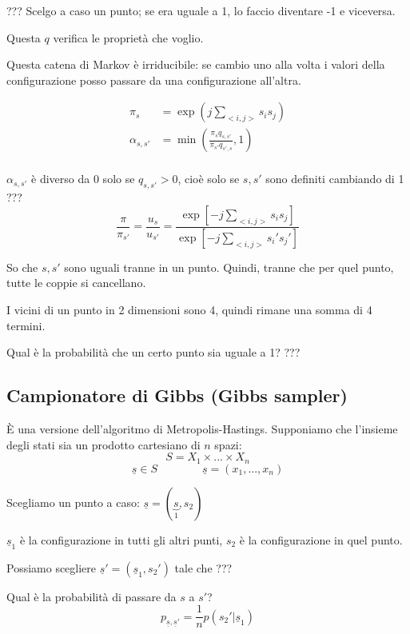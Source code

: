 \documentclass[a4paper,12pt]{book}
\begin{document}
??? %
 Scelgo a caso un punto; se era uguale a 1, lo faccio diventare -1 e viceversa. 

Questa $ q $ verifica le proprietà che voglio. %

Questa catena di Markov è irriducibile: se cambio uno alla volta i valori della configurazione posso passare da una configurazione all'altra.

\begin{align*}
	\pi_s & = \exp (j \sum_{<i,j>} s_i s_j) \\
	\alpha_{s,s'} & = \min \left( \frac{\pi_s q_{s,s'}}{\pi_{s'} q_{s',s}} , 1 \right) \\
\end{align*}

$\alpha_{s,s'}$ è diverso da 0 solo se $ q_{s,s'} > 0 $, cioè solo se $ s,s' $ sono definiti cambiando di 1 ??? %
$$ \frac{\pi}{\pi_{s'}} = \frac{u_s}{u_{s'}} = \frac{\exp \left[ -j \sum_{<i,j>} s_i s_j
	 \right]}{ \exp \left[ -j \sum_{<i,j>} s_i' s_j' \right] } $$

So che $ s,s' $ sono uguali tranne in un punto. Quindi, tranne che per quel punto, tutte le coppie si cancellano. 

I vicini di un punto in 2 dimensioni sono 4, quindi rimane una somma di 4 termini.

Qual è la probabilità che un certo punto sia uguale a 1? ??? %


\subsection{Campionatore di Gibbs (Gibbs sampler)}
È una versione dell'algoritmo di Metropolis-Hastings. Supponiamo che l'insieme degli stati sia un prodotto cartesiano di $ n $ spazi: 
$$ S = X_1 \times ... \times X_n $$
$$ \underline{s} \in S \qquad \qquad \underline{s} = (x_1, ..., x_n) $$

Scegliamo un punto a caso: $ \underline{s} = (\underbrace{s}_1, s_2) $

$ \underline{s}_1 $ è la configurazione in tutti gli altri punti, $ s_2 $ è la configurazione in quel punto. %

Possiamo scegliere $ \underline{s}' = (\underline{s}_1, s_2') $ tale che ??? %

Qual è la probabilità di passare da $ s $ a $ s' $?
$$ p_{\underline{s}, \underline{s}'} = \frac{1}{n} p( s_2' | \underline{s}_1 )$$
\end{document}
